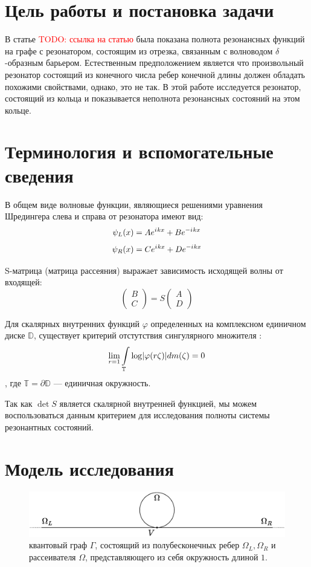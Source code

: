 \documentclass{nsart_eng}
\DeclarePairedDelimiter{\abs}{\lvert}{\rvert}
\newcommand{\bbT}{\mathbb{T}}
\newcommand{\bbD}{\mathbb{D}}
\newcommand{\eexp}[1]{e^{#1}}
\newcommand{\iu}{{i\mkern1mu}}
\renewcommand{\phi}{\varphi}
\newcommand{\todo}[1]{{\large \textcolor{red}{TODO: #1}}}
\begin{document}
\section{Цель работы и постановка задачи}
В статье \todo{ссылка на статью} была показана полнота резонансных функций на графе с резонатором, состоящим из отрезка, связанным с волноводом $\delta$-образным барьером. Естественным предположением является что произвольный резонатор состоящий из конечного числа ребер конечной длины должен обладать похожими свойствами, однако, это не так. В этой работе исследуется резонатор, состоящий из кольца и показывается неполнота резонансных состояний на этом кольце.

\section{Терминология и вспомогательные сведения}
В общем виде волновые функции, являющиеся решениями уравнения Шредингера слева и справа от резонатора имеют вид:
\[
\psi_L(x) = A \eexp{\iu k x} + B \eexp{-\iu k x}
\]
\[
\psi_R(x) = C \eexp{\iu k x} + D \eexp{-\iu k x}
\]

S-матрица (матрица рассеяния) выражает зависимость исходящей волны от входящей:
\[
\begin{pmatrix} B \\ C \end{pmatrix} = S \begin{pmatrix} A \\ D \end{pmatrix}
\]

Для скалярных внутренних функций $\phi$ определенных на комплексном единичном диске $\bbD$, существует критерий отстутствия сингулярного множителя \cite[стр. 99]{nikolskii}:
\[
\lim\limits_{r = 1} \int\limits_{\bbT} \log \abs{\phi(r \zeta)} d m(\zeta) = 0
\]
, где $\bbT = \partial \bbD$ — единичная окружность.

Так как $\det S$ является скалярной внутренней функцией, мы можем воспользоваться данным критерием для исследования полноты системы резонантных состояний.

\section{Модель исследования}
\begin{figure}[!htb]
\includegraphics[width=\textwidth,keepaspectratio]{graph.eps}
\caption{квантовый граф $\Gamma$, состоящий из полубесконечных ребер $\Omega_L, \Omega_R$ и рассеивателя $\Omega$, представляющего из себя окружность длиной $1$.}
\end{figure}
\end{document}
